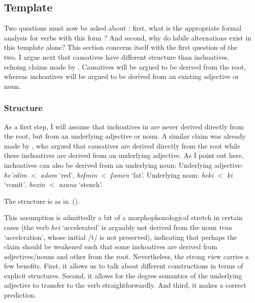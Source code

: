 
	\subsection{Template} \label{vd:inch:template}
Two questions must now be asked about {\thif}: first, what is the appropriate formal analysis for verbs with this form \citep{schwarzwald81,bolozky82}? And second, why do labile alternations exist in this template alone?
This section concerns itself with the first question of the two. I argue next that causatives have different structure than inchoatives, echoing claims made by \cite{borer91}. Causatives will be argued to be derived from the root, whereas inchoatives will be argued to be derived from an existing adjective or noun.%

		\subsubsection{Structure}
As a first step, I will assume that inchoatives in {\thif} are never derived directly from the root, but from an underlying adjective or noun. A similar claim was already made by \cite{borer91}, who argued that causatives are derived directly from the root while these inchoatives are derived from an underlying adjective. As I point out here, inchoatives can also be derived from an underlying noun:
\pex
	\a Underlying adjective: \emph{he'edim} $<$ \emph{adom} `red', \emph{heʃmin} $<$ \emph{ʃamen} `fat'.
	\a Underlying noun: \emph{heki} $<$ \emph{ki} `vomit', \emph{he{\texttslig}xin} $<$ \emph{{\texttslig}axana} `stench'.
\xe

The structure is as in~(\nextx).
\ex
\xe

This assumption is admittedly a bit of a morphophonological stretch in certain cases (the verb \emph{hei{\texttslig}} `accelerated' is arguably not derived from the noun \emph{teu{\texttslig}a} `acceleration', whose initial /t/ is not preserved), indicating that perhaps the claim should be weakened such that some inchoatives are derived from adjectives/nouns and other from the root. Nevertheless, the strong view carries a few benefits. First, it allows us to talk about different constructions in terms of explicit structures. Second, it allows for the degree semantics of the underlying adjective to transfer to the verb straightforwardly. And third, it makes a correct prediction. 

